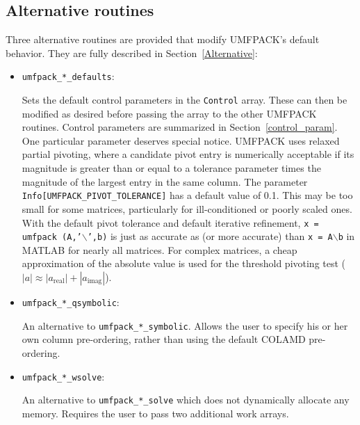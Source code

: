 \subsection{Alternative routines}

Three alternative routines are provided that modify UMFPACK's default
behavior.  They are fully described in Section~\ref{Alternative}:

\begin{itemize}
\item {\tt umfpack\_*\_defaults}:

    Sets the default control parameters in the {\tt Control} array.  These can
    then be modified as desired before passing the array to the other UMFPACK
    routines.  Control parameters are summarized in Section~\ref{control_param}.
    One particular parameter deserves special notice.
    UMFPACK uses relaxed partial pivoting, where a candidate pivot entry is
    numerically acceptable if its magnitude is greater than or equal to a
    tolerance parameter times the magnitude of the largest entry in the same
    column.  The parameter {\tt Info[UMFPACK\_PIVOT\_TOLERANCE]} has a default
    value of 0.1.  This may be too small for some matrices, particularly for
    ill-conditioned or poorly scaled ones.  With the default pivot tolerance
    and default iterative refinement,
        {\tt x = umfpack (A,'}$\backslash${\tt ',b)}
    is just as accurate as (or more accurate) than
        {\tt x = A}$\backslash${\tt b}
    in MATLAB for nearly all matrices.
    For complex matrices, a cheap approximation of the absolute value is
    used for the threshold pivoting test
    ($|a| \approx |a_{\mbox{real}}|+|a_{\mbox{imag}}|$).

\item {\tt umfpack\_*\_qsymbolic}:

    An alternative to {\tt umfpack\_*\_symbolic}.  Allows the user to specify
    his or her own column pre-ordering, rather than using the default COLAMD
    pre-ordering.

\item {\tt umfpack\_*\_wsolve}:

    An alternative to {\tt umfpack\_*\_solve} which does not dynamically
    allocate any memory.  Requires the user to pass two additional work
    arrays.

\end{itemize}

